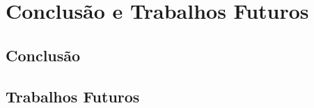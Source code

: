 \chapter[Conclusão e Trabalhos Futuros]{Conclusão e Trabalhos Futuros} \label{cap:conclusao}

    \section{Conclusão}
    
    \section{Trabalhos Futuros}